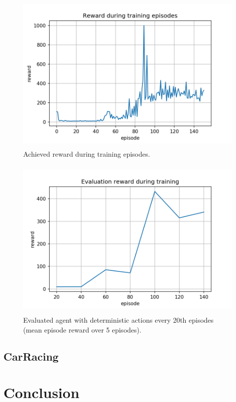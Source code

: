 \documentclass[a4paper,12pt]{article}
\begin{document}
\begin{figure}[H]
	\centering \includegraphics[width=11.70cm, height=7.9cm]{plots/cartpole_episode_reward.png}
	\caption{
		\label{fig:cartpole_episode_reward}
		Achieved reward during training episodes.
	}
\end{figure}

\begin{figure}[H]
	\centering \includegraphics[width=11.70cm, height=7.9cm]{plots/cartpole_evaluation_reward.png}
	\caption{
		\label{fig:cartpole_evaluation_reward}
		Evaluated agent with deterministic actions every 20th episodes (mean episode reward over 5 episodes).
	}
\end{figure}

\subsection{CarRacing}\label{carracing}



\section{Conclusion}
\end{document}
